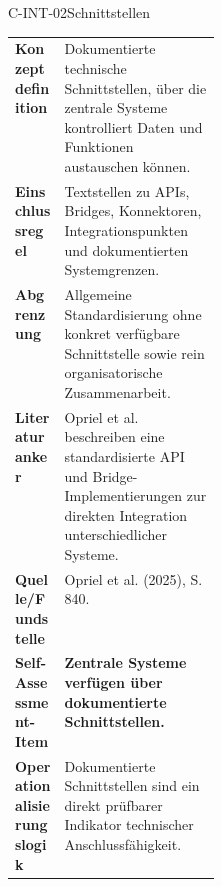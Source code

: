 \documentclass[10pt,a4paper]{article}
\begin{document}
\begin{codecard}{C-INT-02}{Schnittstellen}
\begin{tabularx}{\linewidth}{@{}>{\RaggedRight\arraybackslash\bfseries\color{DeepNavy}}p{0.245\linewidth}>{\RaggedRight\arraybackslash}X@{}}
Konzeptdefinition & Dokumentierte technische Schnittstellen, über die zentrale Systeme kontrolliert Daten und Funktionen austauschen können. \\
\arrayrulecolor{SoftRule}\hline
Einschlussregel & Textstellen zu APIs, Bridges, Konnektoren, Integrationspunkten und dokumentierten Systemgrenzen. \\
\arrayrulecolor{SoftRule}\hline
Abgrenzung & Allgemeine Standardisierung ohne konkret verfügbare Schnittstelle sowie rein organisatorische Zusammenarbeit. \\
\arrayrulecolor{SoftRule}\hline
Literaturanker & Opriel et al. beschreiben eine standardisierte API und Bridge-Implementierungen zur direkten Integration unterschiedlicher Systeme. \\
\arrayrulecolor{SoftRule}\hline
Quelle/Fundstelle & Opriel et al. (2025), S. 840. \\
\arrayrulecolor{SoftRule}\hline
Self-Assessment-Item & \textbf{Zentrale Systeme verfügen über dokumentierte Schnittstellen.} \\
\arrayrulecolor{SoftRule}\hline
Operationalisierungslogik & Dokumentierte Schnittstellen sind ein direkt prüfbarer Indikator technischer Anschlussfähigkeit. \\
\end{tabularx}
\end{codecard}
\end{document}
